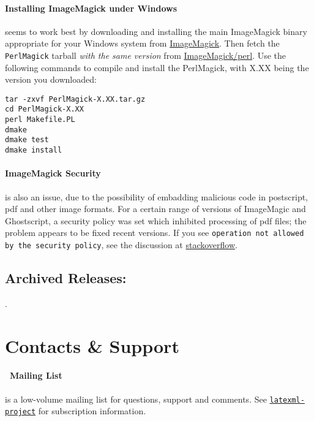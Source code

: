 \documentclass{article}
\begin{document}
\paragraph*{Installing ImageMagick under Windows}\label{get.windows.imagemagick}
seems to work best by downloading and installing the main ImageMagick binary
appropriate for your Windows system
from \href{https://imagemagick.org/script/binary-releases.php#windows}{ImageMagick}.
Then fetch the \texttt{PerlMagick} tarball \emph{with the same version} from
\href{https://imagemagick.com/download/perl/}{ImageMagick/perl}.
Use the following commands to compile and install the PerlMagick,
with X.XX being the version you downloaded:
\begin{lstlisting}[style=shell]
tar -zxvf PerlMagick-X.XX.tar.gz
cd PerlMagick-X.XX
perl Makefile.PL
dmake
dmake test
dmake install
\end{lstlisting}

\paragraph*{ImageMagick Security} is also an issue, due to the possibility of embadding
malicious code in postscript, pdf and other image formats.
For a certain range of versions of ImageMagic and Ghostscript, a security policy was set
which inhibited processing of pdf files; the problem appears to be fixed recent versions.
If you see \texttt{operation not allowed by the security policy}, see the discussion
at \href{https://stackoverflow.com/a/53180170}{stackoverflow}.

\subsection{Archived Releases:}\label{get.archive}
\AllReleases.

\section{Contacts \& Support}\label{contact}

\paragraph{\LaTeXML\ Mailing List}\label{contact.list}
is a low-volume mailing list for questions, support and comments.
See \href{https://lists.informatik.uni-erlangen.de/mailman/listinfo/latexml}{\texttt{latexml-project}} for subscription information.
\end{document}
